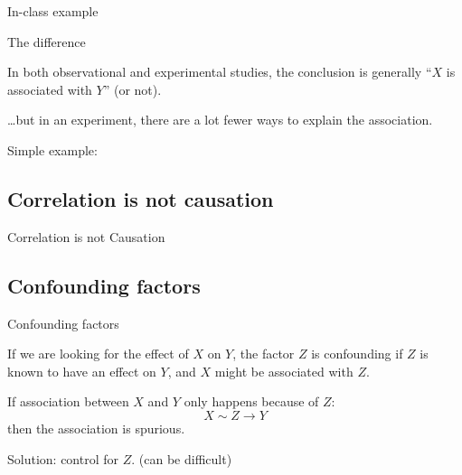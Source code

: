 %
\begin{frame}{In-class example}



\end{frame}


%
\begin{frame}{The difference}

  In \alert{both} observational and experimental studies,
  the conclusion is generally ``$X$ is associated with $Y$'' (or not).

  \vspace{2em}

  \ldots but in an \alert{experiment},
  there are a lot fewer ways to explain the association.

  \vspace{2em}

  \begin{block}{Simple example:}

  \end{block}

\end{frame}


\subsection{Correlation is not causation}

%
\begin{frame}{Correlation is not Causation}

  \begin{center}

  \end{center}

\end{frame}

\subsection{Confounding factors}

%
\begin{frame}{Confounding factors}

If we are looking for the effect of $X$ on $Y$,
the factor $Z$ is \alert{confounding} if $Z$ is known to have an effect on $Y$,
and $X$ might be associated with $Z$.

\vspace{2em}

If association between $X$ and $Y$ only happens because of $Z$:
\[
  X \sim Z \longrightarrow Y
\]
then the association is \alert{spurious}.

\vspace{2em}

\alert{Solution:} control for $Z$.  (can be difficult)

\end{frame}

